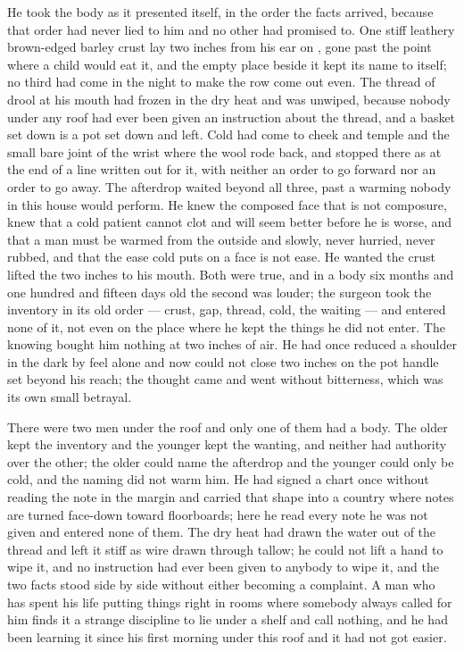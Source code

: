 He took the body as it presented itself, in the order the facts arrived, because that order had never lied to him and no other had promised to. One stiff leathery brown-edged barley crust lay two inches from his ear on , gone past the point where a child would eat it, and the empty place beside it kept its name to itself; no third had come in the night to make the row come out even. The thread of drool at his mouth had frozen in the dry heat and was unwiped, because nobody under any roof had ever been given an instruction about the thread, and a basket set down is a pot set down and left. Cold had come to cheek and temple and the small bare joint of the wrist where the wool rode back, and stopped there as at the end of a line written out for it, with neither an order to go forward nor an order to go away. The afterdrop waited beyond all three, past a warming nobody in this house would perform. He knew the composed face that is not composure, knew that a cold patient cannot clot and will seem better before he is worse, and that a man must be warmed from the outside and slowly, never hurried, never rubbed, and that the ease cold puts on a face is not ease. He wanted the crust lifted the two inches to his mouth. Both were true, and in a body six months and one hundred and fifteen days old the second was louder; the surgeon took the inventory in its old order --- crust, gap, thread, cold, the waiting --- and entered none of it, not even on the place where he kept the things he did not enter. The knowing bought him nothing at two inches of air. He had once reduced a shoulder in the dark by feel alone and now could not close two inches on the pot handle set beyond his reach; the thought came and went without bitterness, which was its own small betrayal.

There were two men under the roof and only one of them had a body. The older kept the inventory and the younger kept the wanting, and neither had authority over the other; the older could name the afterdrop and the younger could only be cold, and the naming did not warm him. He had signed a chart once without reading the note in the margin and carried that shape into a country where notes are turned face-down toward floorboards; here he read every note he was not given and entered none of them. The dry heat had drawn the water out of the thread and left it stiff as wire drawn through tallow; he could not lift a hand to wipe it, and no instruction had ever been given to anybody to wipe it, and the two facts stood side by side without either becoming a complaint. A man who has spent his life putting things right in rooms where somebody always called for him finds it a strange discipline to lie under a shelf and call nothing, and he had been learning it since his first morning under this roof and it had not got easier.

